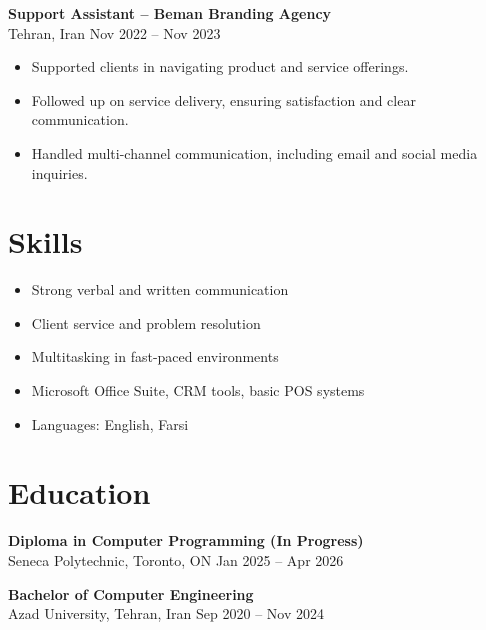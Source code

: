 \documentclass[letterpaper,10pt]{article}
\begin{document}
\textbf{Support Assistant – Beman Branding Agency}\\
Tehran, Iran \hfill Nov 2022 -- Nov 2023
\begin{itemize}[leftmargin=*]
  \item Supported clients in navigating product and service offerings.
  \item Followed up on service delivery, ensuring satisfaction and clear communication.
  \item Handled multi-channel communication, including email and social media inquiries.
\end{itemize}

\section*{Skills}
\begin{itemize}[leftmargin=*]
  \item Strong verbal and written communication
  \item Client service and problem resolution
  \item Multitasking in fast-paced environments
  \item Microsoft Office Suite, CRM tools, basic POS systems
  \item Languages: English, Farsi
\end{itemize}

\section*{Education}
\textbf{Diploma in Computer Programming (In Progress)}\\
Seneca Polytechnic, Toronto, ON \hfill Jan 2025 -- Apr 2026

\textbf{Bachelor of Computer Engineering}\\
Azad University, Tehran, Iran \hfill Sep 2020 -- Nov 2024
\end{document}
